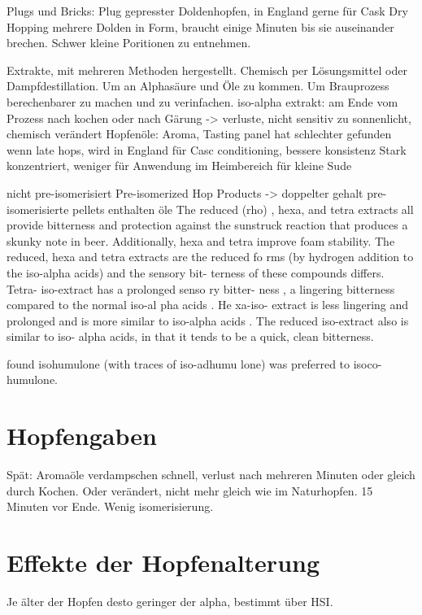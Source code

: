 \documentclass[a4paper,parskip=half]{scrartcl}
\begin{document}
\parencite[84\psq]{Garetz1994}
Plugs und Bricks: 
Plug gepresster Doldenhopfen, in England gerne für Cask Dry Hopping
mehrere Dolden in Form, braucht einige Minuten bis sie auseinander
brechen. Schwer kleine Poritionen zu entnehmen.

\parencite[88-93]{Garetz1994}
Extrakte, mit mehreren Methoden hergestellt. Chemisch per Lösungsmittel
oder Dampfdestillation. Um an Alphasäure und Öle zu kommen.
Um Brauprozess berechenbarer zu machen und zu verinfachen.
iso-alpha extrakt: am Ende vom Prozess nach kochen oder
nach Gärung -> verluste, nicht sensitiv zu sonnenlicht, chemisch verändert
Hopfenöle: Aroma, Tasting panel hat schlechter gefunden wenn
late hops, wird in England für Casc conditioning, bessere konsistenz
Stark konzentriert, weniger für Anwendung im Heimbereich für
kleine Sude

\parencite[52]{Davidson1997}
nicht pre-isomerisiert
Pre-isomerized Hop Products -> doppelter gehalt
pre-isomerisierte pellets enthalten öle
The reduced (rho) , hexa, and tetra extracts
all provide bitterness and protection against
the sunstruck reaction that produces a
skunky note in beer. Additionally, hexa and
tetra improve foam stability.
The
reduced, hexa and tetra extracts are the
reduced fo rms (by hydrogen addition to
the iso-alpha acids) and the sensory bit-
terness of these compounds differs. Tetra-
iso-extract has a prolonged senso ry bitter-
ness , a lingering bitterness compared to
the normal iso-al pha acids . He xa-iso-
extract is less lingering and prolonged and
is more similar to iso-alpha acids . The
reduced iso-extract also is similar to iso-
alpha acids, in that it tends to be a quick,
clean bitterness.

found isohumulone (with traces of
iso-adhumu lone) was preferred to isoco-
humulone.

\section*{Hopfengaben}

\parencite[15]{Garetz1994}
Spät: Aromaöle verdampschen schnell, verlust nach mehreren Minuten
oder gleich durch Kochen. Oder verändert, nicht mehr gleich
wie im Naturhopfen. 15 Minuten vor Ende. Wenig isomerisierung.

\section*{Effekte der Hopfenalterung}

\parencite[50]{Holle2010}
Je älter der Hopfen desto geringer der alpha, bestimmt über
HSI.
\end{document}
